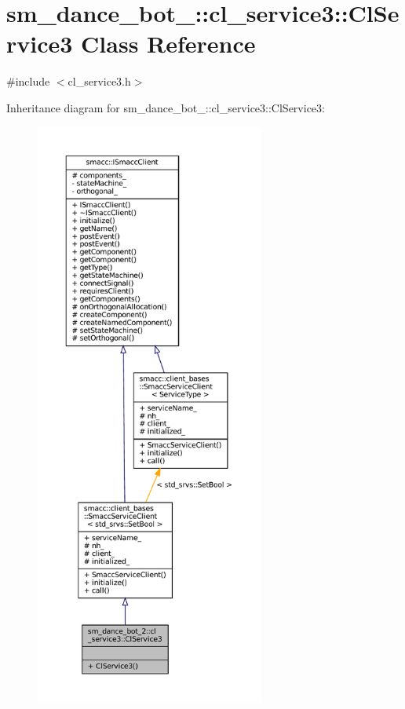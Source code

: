 \hypertarget{classsm__dance__bot__2_1_1cl__service3_1_1ClService3}{}\section{sm\+\_\+dance\+\_\+bot\+\_\+:\+:cl\+\_\+service3\+:\+:Cl\+Service3 Class Reference}
\label{classsm__dance__bot__2_1_1cl__service3_1_1ClService3}


{\ttfamily \#include $<$cl\+\_\+service3.\+h$>$}



Inheritance diagram for sm\+\_\+dance\+\_\+bot\+\_\+:\+:cl\+\_\+service3\+:\+:Cl\+Service3\+:
\nopagebreak
\begin{figure}[H]
\begin{center}
\leavevmode
\includegraphics[height=550pt]{classsm__dance__bot__2_1_1cl__service3_1_1ClService3__inherit__graph}
\end{center}
\end{figure}


